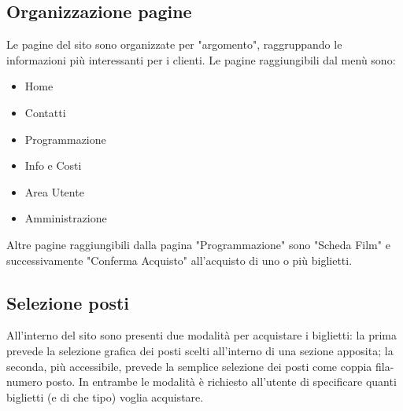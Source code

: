 \documentclass[a4paper, 12pt]{article}
\begin{document}
\subsection{Organizzazione pagine}
Le pagine del sito sono organizzate per "argomento", raggruppando le informazioni più interessanti per i clienti.
Le pagine raggiungibili dal menù sono:
\begin{itemize}
    \item Home
    \item Contatti
    \item Programmazione
    \item Info e Costi
    \item Area Utente
    \item Amministrazione
\end{itemize}
Altre pagine raggiungibili dalla pagina "Programmazione" sono "Scheda Film" e successivamente "Conferma Acquisto" all'acquisto di uno o più biglietti.
\subsection{Selezione posti}
All'interno del sito sono presenti due modalità per acquistare i biglietti: la prima prevede la selezione grafica dei posti scelti all'interno di una sezione apposita; la seconda, più accessibile, prevede la semplice selezione dei posti come coppia fila-numero posto. In entrambe le modalità è richiesto all'utente di specificare quanti biglietti (e di che tipo) voglia acquistare.
\end{document}
